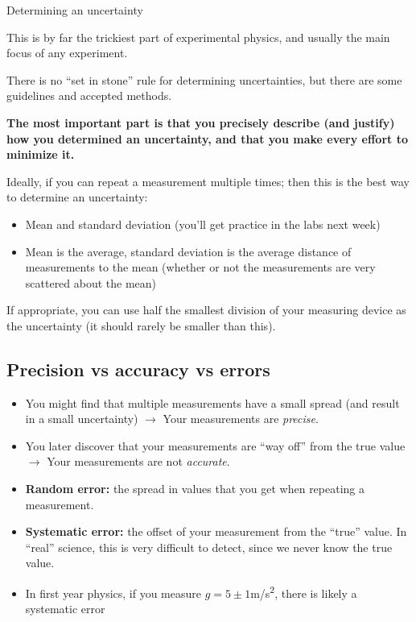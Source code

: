 \documentclass[aspectratio=169,
hyperref={colorlinks,urlcolor=blue}
]{beamer}
\begin{document}
\begin{bulletframe}{Determining an uncertainty}
\item This is by far the trickiest part of experimental physics, and usually the main focus of any experiment.
\item There is no “set in stone” rule for determining uncertainties, but there are some guidelines and accepted methods.
\item \textbf{The most important part is that you precisely describe (and justify) how you determined an uncertainty, and that you make every effort to minimize it.}
\item Ideally, if you can repeat a measurement multiple times; then this is the best way to determine an uncertainty:
\begin{itemize}
\item Mean and standard deviation (you’ll get practice in the labs next week)
\item Mean is the average, standard deviation is the average distance of measurements to the mean (whether or not the measurements are very scattered about the mean)
\end{itemize}
\item If appropriate, you can use half the smallest division of your measuring device as the uncertainty (it should rarely be smaller than this).
\end{bulletframe}

\subsection{Precision vs accuracy  vs errors}
\label{subsec:precisionvsaccuracyvserrors}
{
\begin{itemize}
\item You might find that multiple measurements have a small spread (and result in a small uncertainty) $\rightarrow$ Your measurements are \emph{precise}.
\item You later discover that your measurements are “way off” from the true value $\rightarrow$ Your measurements are not \emph{accurate}.
\item \textbf{Random error:} the spread in values that you get when repeating a measurement.
\item \textbf{Systematic error:} the offset of your measurement from the “true” value. In “real” science, this is very difficult to detect, since we never know the true value.
\item In first year physics, if you measure $g=5\pm 1$\si{m/s^2}, there is likely a systematic error
\end{itemize}
}
{
}
\end{document}

